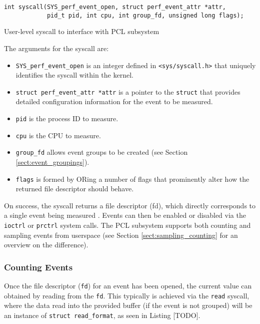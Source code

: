 \begin{listing}\label{lst:perf_events_open_syscall}
    \begin{verbatim}
int syscall(SYS_perf_event_open, struct perf_event_attr *attr,
            pid_t pid, int cpu, int group_fd, unsigned long flags);
    \end{verbatim}
    \caption{User-level syscall to interface with PCL subsystem \cite{}}
\end{listing}

The arguments for the syscall are:
\ssp\begin{itemize}
    \item \texttt{SYS\_perf\_event\_open} is an integer defined in \texttt{<sys/syscall.h>} that uniquely identifies the syscall within the kernel.
    \item \texttt{struct perf\_event\_attr *attr} is a pointer to the \texttt{struct} that provides detailed configuration information for the event to be measured. 
    \item \texttt{pid} is the process ID to measure.
    \item \texttt{cpu} is the CPU to measure.
    \item \texttt{group\_fd} allows event groups to be created (see Section \ref{sect:event_groupings}).
    \item \texttt{flags} is formed by ORing a number of flags that prominently alter how the returned file descriptor should behave.
\end{itemize}\dsp

On success, the syscall returns a file descriptor (fd), which directly corresponds to a single event being measured \cite{}. Events can then be enabled or disabled via the \texttt{ioctrl} or \texttt{prctrl} system calls. The PCL subsystem supports both counting and sampling events from userspace (see Section \ref{sect:sampling_counting} for an overview on the difference). 

\subsubsection{Counting Events}

Once the file descriptor (\texttt{fd}) for an event has been opened, the current value can obtained by reading from the \texttt{fd}. This typically is achieved via the \texttt{read} syscall, where the data read into the provided buffer (if the event is not grouped) will be an instance of \texttt{struct read\_format}, as seen in Listing [TODO].

